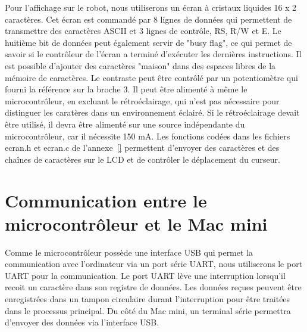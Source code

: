 Pour l'affichage sur le robot, nous utiliserons un écran à cristaux liquides 16 x 2  caractères. Cet écran est commandé par 8 lignes de données qui permettent de transmettre des caractères ASCII et 3 lignes de contrôle, RS, R/W et E. Le huitième bit de données peut également servir de "busy flag", ce qui permet de savoir si le contrôleur de l'écran a terminé d'exécuter les dernières instructions. Il est possible d'ajouter des caractères "maison" dans des espaces libres de la mémoire de caractères. Le contraste peut être contrôlé par un potentiomètre qui fourni la référence sur la broche 3. Il peut être alimenté à même le microcontrôleur, en excluant le rétroéclairage, qui n'est pas nécessaire pour distinguer les caratères dans un environnement éclairé. Si le rétroéclairage devait être utilisé, il devra être alimenté sur une source indépendante du microcontrôleur, car il nécessite 150 mA. Les fonctions codées dans les fichiers ecran.h et ecran.c de l'annexe~\ref{} permettent d'envoyer des caractères et des chaînes de caractères sur le LCD et de contrôler le déplacement du curseur.

\section{Communication entre le microcontrôleur et le Mac mini} \label{s:comm_mac_micro}

Comme le microcontrôleur possède une interface USB qui permet la communication avec l'ordinateur via un port série UART, nous utiliserons le port UART pour la communication. Le port UART lève une interruption lorsqu'il recoit un caractère dans son registre de données. Les données reçues peuvent être enregistrées dans un tampon circulaire durant l'interruption pour être traitées dans le processus principal. Du côté du Mac mini, un terminal série permettra d'envoyer des données via l'interface USB. 

